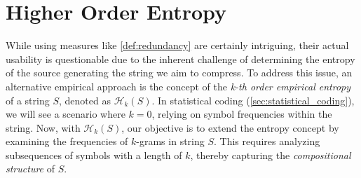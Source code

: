 \clearpage
\section{Higher Order Entropy} \label{sec:higher_order_entropy}


\begin{definition}[Redundacy] \label{def:redundancy}
\end{definition}


\noindent While using measures like \ref{def:redundancy} are certainly intriguing, their actual usability is questionable due to the inherent challenge of determining the entropy of the source generating the string we aim to compress. To address this issue, an alternative empirical approach is the concept of the \emph{k-th order empirical entropy} of a string $S$, denoted as $\mathcal{H}_k(S)$. In statistical coding (\autoref{sec:statistical_coding}), we will see a scenario where $k=0$, relying on symbol frequencies within the string. Now, with $\mathcal{H}_k(S)$, our objective is to extend the entropy concept by examining the frequencies of $k$-grams in string $S$. This requires analyzing subsequences of symbols with a length of $k$, thereby capturing the \emph{compositional structure} of $S$. \cite{ferragina2023pearls} \vspace{0.4cm}

